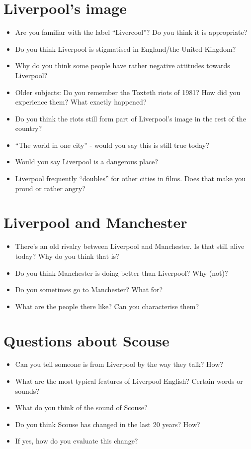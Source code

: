 {	
	\section*{Liverpool's image}
	
		\begin{itemize}
			\item Are you familiar with the label ``Livercool''? Do you think it is appropriate?
			\item Do you think Liverpool is stigmatised in England/the United Kingdom?
			\item Why do you think some people have rather negative attitudes towards Liverpool?
			\item Older subjects: Do you remember the Toxteth riots of 1981? How did you experience them? What exactly happened?
			\item Do you think the riots still form part of Liverpool's image in the rest of the country?
			\item ``The world in one city'' - would you say this is still true today?
			\item Would you say Liverpool is a dangerous place?
			\item Liverpool frequently ``doubles'' for other cities in films. Does that make you proud or rather angry?
		\end{itemize}
	
	
	\section*{Liverpool and Manchester}
	
		\begin{itemize}
			\item There's an old rivalry between Liverpool and Manchester. Is that still alive today? Why do you think that is?
			\item Do you think Manchester is doing better than Liverpool? Why (not)?
			\item Do you sometimes go to Manchester? What for?
			\item What are the people there like? Can you characterise them?
		\end{itemize}
	
	
	\section*{Questions about Scouse}
	
		\begin{itemize}
			\item Can you tell someone is from Liverpool by the way they talk? How?
			\item What are the most typical features of Liverpool English? Certain words or sounds?
			\item What do you think of the sound of Scouse?
			\item Do you think Scouse has changed in the last 20 years? How? 
			\item If yes, how do you evaluate this change?
		\end{itemize}		
	}%